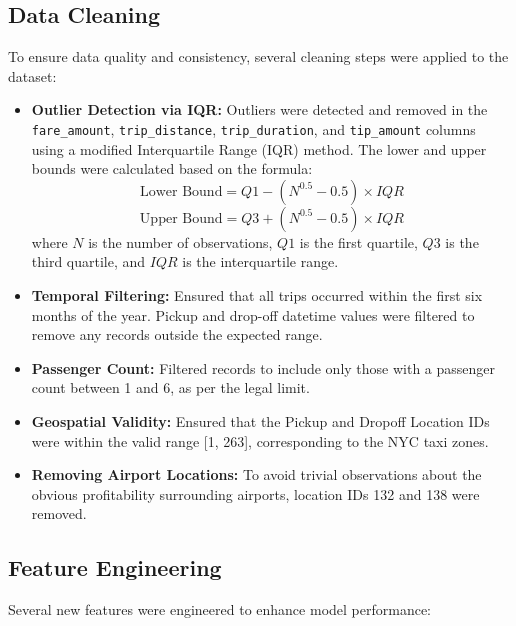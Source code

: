 \documentclass[11pt]{article}
\begin{document}
\subsection{Data Cleaning}

To ensure data quality and consistency, several cleaning steps were applied to the dataset:

\begin{itemize}
    \item \textbf{Outlier Detection via IQR:} Outliers were detected and removed in the \texttt{fare\_amount}, \texttt{trip\_distance}, \texttt{trip\_duration}, and \texttt{tip\_amount} columns using a modified Interquartile Range (IQR) method. The lower and upper bounds were calculated based on the formula:
    \[
    \text{Lower Bound} = Q1 - \left(N^{0.5} - 0.5\right) \times IQR
    \]
    \[
    \text{Upper Bound} = Q3 + \left(N^{0.5} - 0.5\right) \times IQR
    \]
    where \( N \) is the number of observations, \( Q1 \) is the first quartile, \( Q3 \) is the third quartile, and \( IQR \) is the interquartile range.

    \item \textbf{Temporal Filtering:} Ensured that all trips occurred within the first six months of the year. Pickup and drop-off datetime values were filtered to remove any records outside the expected range.

    \item \textbf{Passenger Count:} Filtered records to include only those with a passenger count between 1 and 6, as per the legal limit.

    \item \textbf{Geospatial Validity:} Ensured that the Pickup and Dropoff Location IDs were within the valid range [1, 263], corresponding to the NYC taxi zones.

    \item \textbf{Removing Airport Locations:} To avoid trivial observations about the obvious profitability surrounding airports, location IDs 132 and 138 were removed.
\end{itemize}

\subsection{Feature Engineering}

Several new features were engineered to enhance model performance:
\end{document}
